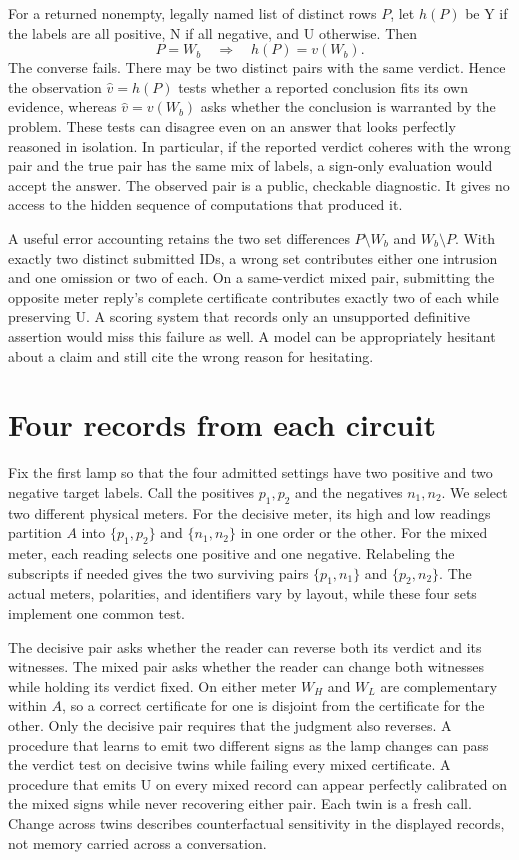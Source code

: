 \documentclass[12pt,letterpaper]{article}
\begin{document}
For a returned nonempty, legally named list of distinct rows $P$, let $h(P)$ be Y if the labels are all positive, N if all negative, and U otherwise. Then
\[
  P=W_b \quad\Longrightarrow\quad h(P)=v(W_b).
\]
The converse fails. There may be two distinct pairs with the same verdict. Hence the observation $\widehat v=h(P)$ tests whether a reported conclusion fits its own evidence, whereas $\widehat v=v(W_b)$ asks whether the conclusion is warranted by the problem. These tests can disagree even on an answer that looks perfectly reasoned in isolation. In particular, if the reported verdict coheres with the wrong pair and the true pair has the same mix of labels, a sign-only evaluation would accept the answer. The observed pair is a public, checkable diagnostic. It gives no access to the hidden sequence of computations that produced it.

A useful error accounting retains the two set differences $P\setminus W_b$ and $W_b\setminus P$. With exactly two distinct submitted IDs, a wrong set contributes either one intrusion and one omission or two of each. On a same-verdict mixed pair, submitting the opposite meter reply's complete certificate contributes exactly two of each while preserving U. A scoring system that records only an unsupported definitive assertion would miss this failure as well. A model can be appropriately hesitant about a claim and still cite the wrong reason for hesitating.

\section{Four records from each circuit}

Fix the first lamp so that the four admitted settings have two positive and two negative target labels. Call the positives $p_1,p_2$ and the negatives $n_1,n_2$. We select two different physical meters. For the decisive meter, its high and low readings partition $A$ into $\{p_1,p_2\}$ and $\{n_1,n_2\}$ in one order or the other. For the mixed meter, each reading selects one positive and one negative. Relabeling the subscripts if needed gives the two surviving pairs $\{p_1,n_1\}$ and $\{p_2,n_2\}$. The actual meters, polarities, and identifiers vary by layout, while these four sets implement one common test.

The decisive pair asks whether the reader can reverse both its verdict and its witnesses. The mixed pair asks whether the reader can change both witnesses while holding its verdict fixed. On either meter $W_H$ and $W_L$ are complementary within $A$, so a correct certificate for one is disjoint from the certificate for the other. Only the decisive pair requires that the judgment also reverses. A procedure that learns to emit two different signs as the lamp changes can pass the verdict test on decisive twins while failing every mixed certificate. A procedure that emits U on every mixed record can appear perfectly calibrated on the mixed signs while never recovering either pair. Each twin is a fresh call. Change across twins describes counterfactual sensitivity in the displayed records, not memory carried across a conversation.
\end{document}
